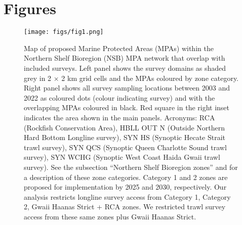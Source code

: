 \documentclass[12pt]{article}
\begin{document}
\clearpage



\section*{Figures}

\begin{figure}[htb]
  \centering
  \texttt{[image: figs/fig1.png]}
  \caption{Map of proposed Marine Protected Areas (MPAs) within the Northern Shelf Bioregion (NSB) MPA network that overlap with included surveys. Left panel shows the survey domains as shaded grey in 2 $\times$ 2 km grid cells and the MPAs coloured by zone category. Right panel shows all survey sampling locations between 2003 and 2022 as coloured dots (colour indicating survey) and with the overlapping MPAs coloured in black. Red square in the right inset indicates the area shown in the main panels. Acronyms: RCA (Rockfish Conservation Area), HBLL OUT N (Outside Northern Hard Bottom Longline survey), SYN HS (Synoptic Hecate Strait trawl survey), SYN QCS (Synoptic Queen Charlotte Sound trawl survey), SYN WCHG (Synoptic West Coast Haida Gwaii trawl survey). See the subsection ``Northern Shelf Bioregion zones'' and \citep{dfo2022networkactionplan} for a description of these zone categories. Category 1 and 2 zones are proposed for implementation by 2025 and 2030, respectively. Our analysis restricts longline survey access from Category 1, Category 2, Gwaii Haanas Strict + RCA zones. We restricted trawl survey access from these same zones plus Gwaii Haanas Strict.}
  \label{fig:map}
\end{figure}


\end{document}

